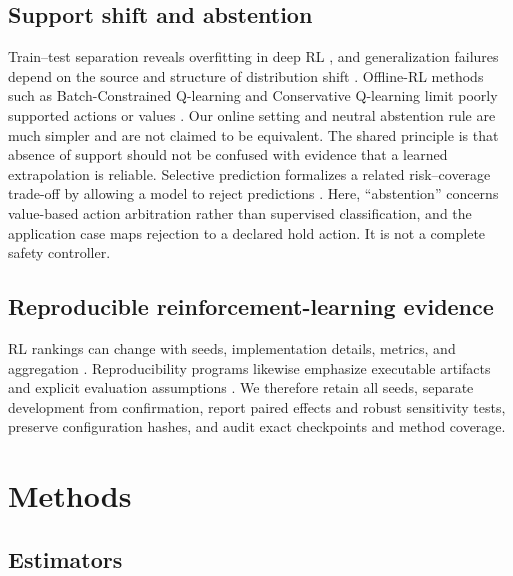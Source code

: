 \documentclass[preprint,12pt]{elsarticle}
\begin{document}
\subsection{Support shift and abstention}

Train--test separation reveals overfitting in deep RL
\cite{cobbe2019quantifying}, and generalization failures depend on the source
and structure of distribution shift \cite{kirk2023survey}. Offline-RL methods
such as Batch-Constrained Q-learning and Conservative Q-learning limit poorly
supported actions or values \cite{fujimoto2019offpolicy,kumar2020conservative}.
Our online setting and neutral abstention rule are much simpler and are not
claimed to be equivalent. The shared principle is that absence of support
should not be confused with evidence that a learned extrapolation is reliable.
Selective prediction formalizes a related risk--coverage trade-off by allowing
a model to reject predictions \cite{geifman2019selectivenet}. Here,
``abstention'' concerns value-based action arbitration rather than supervised
classification, and the application case maps rejection to a declared hold
action. It is not a complete safety controller.

\subsection{Reproducible reinforcement-learning evidence}

RL rankings can change with seeds, implementation details, metrics, and
aggregation \cite{henderson2018matters,agarwal2021precipice}. Reproducibility
programs likewise emphasize executable artifacts and explicit evaluation
assumptions \cite{pineau2021improving}. We therefore retain all seeds, separate
development from confirmation, report paired effects and robust sensitivity
tests, preserve configuration hashes, and audit exact checkpoints and method
coverage.

\section{Methods}
\label{sec:methods}

\subsection{Estimators}
\end{document}

